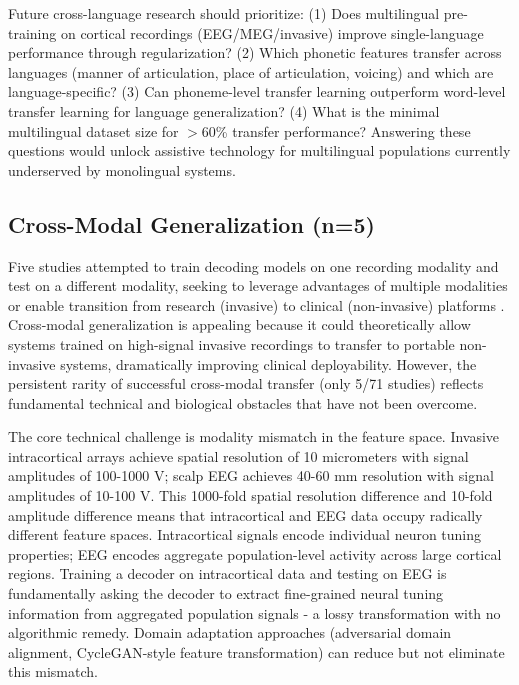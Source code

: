 Future cross-language research should prioritize: (1) Does multilingual pre-training on cortical recordings (EEG/MEG/invasive) improve single-language performance through regularization? (2) Which phonetic features transfer across languages (manner of articulation, place of articulation, voicing) and which are language-specific? (3) Can phoneme-level transfer learning outperform word-level transfer learning for language generalization? (4) What is the minimal multilingual dataset size for $>$60\% transfer performance? Answering these questions would unlock assistive technology for multilingual populations currently underserved by monolingual systems.

\subsection{Cross-Modal Generalization (n=5)}

Five studies attempted to train decoding models on one recording modality and test on a different modality, seeking to leverage advantages of multiple modalities or enable transition from research (invasive) to clinical (non-invasive) platforms \cite{Peterson2021,deBorman2024}. Cross-modal generalization is appealing because it could theoretically allow systems trained on high-signal invasive recordings to transfer to portable non-invasive systems, dramatically improving clinical deployability. However, the persistent rarity of successful cross-modal transfer (only 5/71 studies) reflects fundamental technical and biological obstacles that have not been overcome.

The core technical challenge is modality mismatch in the feature space. Invasive intracortical arrays achieve spatial resolution of 10 micrometers with signal amplitudes of 100-1000 \textmu{}V; scalp EEG achieves 40-60 mm resolution with signal amplitudes of 10-100 \textmu{}V. This 1000-fold spatial resolution difference and 10-fold amplitude difference means that intracortical and EEG data occupy radically different feature spaces. Intracortical signals encode individual neuron tuning properties; EEG encodes aggregate population-level activity across large cortical regions. Training a decoder on intracortical data and testing on EEG is fundamentally asking the decoder to extract fine-grained neural tuning information from aggregated population signals - a lossy transformation with no algorithmic remedy. Domain adaptation approaches (adversarial domain alignment, CycleGAN-style feature transformation) can reduce but not eliminate this mismatch.

